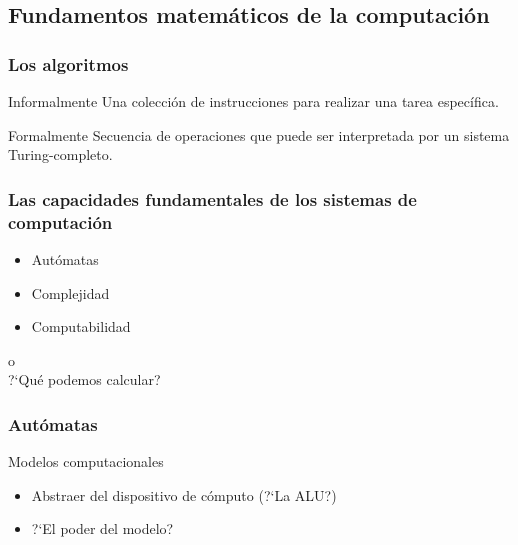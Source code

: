 \subsection{Fundamentos matem\'aticos de la computaci\'on}

\begin{frame}
    \frametitle{Los algoritmos}
    \begin{block}{Informalmente}
        Una colecci\'on de instrucciones para realizar una tarea espec\'ifica.
    \end{block}
    \pause
    \begin{block}{Formalmente}
        Secuencia de operaciones que puede ser interpretada por un sistema Turing-completo.
    \end{block}
\end{frame}


\begin{frame}
    \frametitle{Las capacidades fundamentales de los sistemas de computaci\'on}
    \begin{itemize}
        \item Aut\'omatas 
        \item Complejidad \pause
        \item Computabilidad \pause
    \end{itemize}
    o\\
    ?`Qu\'e podemos calcular?
\end{frame}


\begin{frame}
    \frametitle{Aut\'omatas}
    Modelos computacionales
    \begin{itemize}
        \item Abstraer del dispositivo de c\'omputo (?`La ALU?) \pause
        \item ?`El poder del modelo?
    \end{itemize}
\end{frame}



